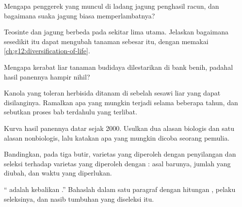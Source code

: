 \begin{exercise}[$\star\star$]\label{exo:g12:domesticated-plants:9}
Mengapa penggerek yang  muncul di ladang jagung penghasil racun,
dan bagaimana suaka jagung biasa memperlambatnya?
\end{exercise}

\begin{exercise}[$\star\star$]\label{exo:g12:domesticated-plants:10}
Teosinte dan jagung berbeda pada sekitar lima  utama. Jelaskan
bagaimana  sesedikit itu dapat mengubah tanaman sebesar itu, dengan
memakai \cref{ch:g12:diversification-of-life}.
\end{exercise}

\begin{exercise}[$\star\star$]\label{exo:g12:domesticated-plants:11}
Mengapa kerabat liar tanaman budidaya dilestarikan di bank benih,
padahal hasil panennya hampir nihil?
\end{exercise}

\begin{exercise}[$\star\star\star$]\label{exo:g12:domesticated-plants:12}
Kanola yang toleran herbisida ditanam di sebelah sesawi liar yang
dapat disilanginya. Ramalkan apa yang mungkin terjadi selama beberapa
tahun, dan sebutkan proses bab terdahulu yang terlibat.
\end{exercise}

\begin{exercise}[$\star\star\star$]\label{exo:g12:domesticated-plants:13}
Kurva hasil panennya datar sejak 2000. Usulkan dua alasan biologis dan
satu alasan nonbiologis, lalu katakan apa yang mungkin dicoba seorang
pemulia.
\end{exercise}

\begin{exercise}[$\star\star\star$]\label{exo:g12:domesticated-plants:14}
Bandingkan, pada tiga butir, varietas yang diperoleh dengan
penyilangan dan seleksi terhadap varietas yang diperoleh dengan
: asal  barunya, jumlah  yang diubah, dan waktu
yang diperlukan.
\end{exercise}

\begin{exercise}[$\star\star\star$]\label{exo:g12:domesticated-plants:15}
`` adalah kebalikan .'' Bahaslah dalam satu
paragraf dengan hitungan , pelaku seleksinya, dan nasib
tumbuhan yang diseleksi itu.
\end{exercise}

